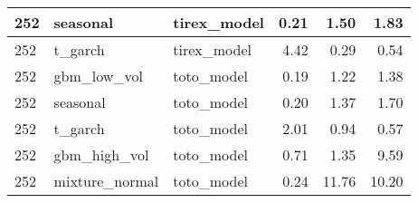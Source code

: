 {\begin{tabular}{lllrrr}
\midrule
252 & seasonal & tirex\_model & 0.21 & 1.50 & 1.83 \\
\midrule
252 & t\_garch & tirex\_model & 4.42 & 0.29 & 0.54 \\
\midrule
252 & gbm\_low\_vol & toto\_model & 0.19 & 1.22 & 1.38 \\
\midrule
252 & seasonal & toto\_model & 0.20 & 1.37 & 1.70 \\
\midrule
252 & t\_garch & toto\_model & 2.01 & 0.94 & 0.57 \\
\midrule
252 & gbm\_high\_vol & toto\_model & 0.71 & 1.35 & 9.59 \\
\midrule
252 & mixture\_normal & toto\_model & 0.24 & 11.76 & 10.20 \\
\bottomrule
\end{tabular}
}